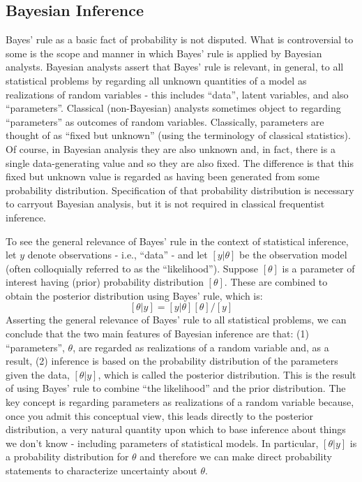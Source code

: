 \subsection{Bayesian Inference}

Bayes' rule as a basic fact of probability is not disputed.
What is controversial to some is the scope and manner in which Bayes'
rule is applied by Bayesian analysts. Bayesian analysts assert that
Bayes' rule is relevant, in general, to all statistical problems by
regarding all unknown quantities of a model as realizations of random
variables - this includes ``data'', latent variables, and also
``parameters''. Classical (non-Bayesian) analysts sometimes object to
regarding ``parameters'' as outcomes of random variables. Classically,
parameters are thought of as ``fixed but unknown'' (using the
terminology of classical statistics). Of course, in Bayesian analysis
they are also unknown and, in fact, there is a single data-generating
value and so they are also fixed. The difference is that this fixed
but unknown value is regarded as having been generated from some
probability distribution. Specification of that probability
distribution is necessary to carryout Bayesian analysis, but it is not
required in classical frequentist inference.


To see the general relevance of Bayes' rule in the context of
statistical inference, let $y$ denote observations - i.e., ``data'' -
and let $[y|\theta]$ be the observation model (often colloquially
referred to as the ``likelihood'').  Suppose $[\theta]$ %
is a parameter of
interest having (prior) probability distribution $[\theta]$. These are
combined to obtain the posterior distribution using Bayes' rule, which
is:
\[
 [\theta|y]= [y|\theta][\theta]/[y]
\]
Asserting the general relevance of Bayes' rule to all statistical
problems, we can conclude that the two main features of Bayesian
inference are that: (1) ``parameters'', $\theta$, are regarded as realizations of
a random variable and, as a result, (2) inference is based on the
probability distribution of the parameters given the data,
$[\theta|y]$,
which is
called the posterior distribution. This is the result of using Bayes'
rule to combine ``the likelihood'' and the prior distribution.  The
key concept is regarding parameters as realizations of a random
variable because, once you admit this conceptual view, this leads
directly to the posterior distribution, a very natural quantity upon
which to base inference about things we don't know -  including
parameters of statistical models.  In particular, $[\theta|y]$ is a
probability distribution for $\theta$ and therefore we can make direct
probability statements to characterize uncertainty about
$\theta$.

